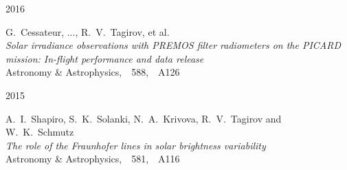 \begin{cventries}
  \cventry
    {}     %
    {}     %
    {}     %
    {2016} %
    {
      \begin{cvitems} %
        \item {G.~Cessateur, ..., R.~V.~Tagirov, et al.\\
               \textit{Solar irradiance observations with PREMOS filter radiometers on the PICARD mission: In-flight performance and data release}\\
               Astronomy \& Astrophysics,\ \ 588,\ \ A126}
      \end{cvitems}
    }

  \cventry
    {}     %
    {}     %
    {}     %
    {2015} %
    {
      \begin{cvitems} %
        \item {A.~I.~Shapiro, S.~K.~Solanki, N.~A.~Krivova, R.~V.~Tagirov and W.~K.~Schmutz\\
               \textit{The role of the Fraunhofer lines in solar brightness variability}\\
               Astronomy \& Astrophysics,\ \ 581,\ \ A116}
      \end{cvitems}
    }

\end{cventries}
